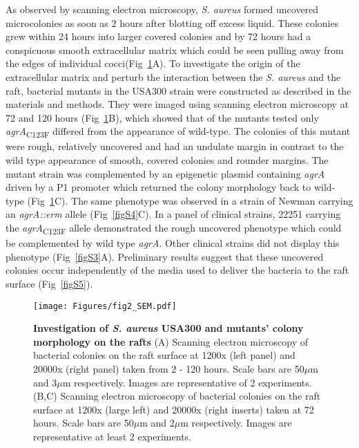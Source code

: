 \documentclass[10pt,letterpaper]{article}
\begin{document}
As observed by scanning electron microscopy, \textit{S. aureus} formed uncovered microcolonies as soon as 2 hours after blotting off excess liquid.
These colonies grew within 24 hours into larger covered colonies and by 72 hours had a conspicuous smooth extracellular matrix which could be seen pulling away from the edges of individual cocci(Fig~\ref{fig2}A).
To investigate the origin of the extracellular matrix and perturb the interaction between the \textit{S. aureus} and the raft, bacterial mutants in the USA300 strain were constructed as described in the materials and methods.
They were imaged using scanning electron microscopy at 72 and 120 hours (Fig~\ref{fig2}B), which showed that of the mutants tested only \textit{agrA}\textsubscript{C123F} differed from the appearance of wild-type.
The colonies of this mutant were rough, relatively uncovered and had an undulate margin in contrast to the wild type appearance of smooth, covered colonies and rounder margins.
The mutant strain was complemented by an epigenetic plasmid containing \textit{agrA} driven by a P1 promoter which returned the colony morphology back to wild-type (Fig~\ref{fig2}C).
The same phenotype was observed in a strain of Newman carrying an \textit{agrA::erm} allele (Fig~\ref{figS4}C).
In a panel of clinical strains, 22251 carrying the \textit{agrA}\textsubscript{C123F} allele demonstrated the rough uncovered phenotype which could be complemented by wild type \textit{agrA}.
Other clinical strains did not display this phenotype (Fig~\ref{figS3}A).
Preliminary results suggest that these uncovered colonies occur independently of the media used to deliver the bacteria to the raft surface (Fig~\ref{figS5}).

\begin{figure}[!ht]
\begin{adjustwidth}{-2.25in}{0in}
\texttt{[image: Figures/fig2\_SEM.pdf]}
\caption[Investigation of \textit{S. aureus} USA300 and mutants' colony morphology on the rafts]{
	\textbf{Investigation of \textit{S. aureus} USA300 and mutants' colony morphology on the rafts}
	(A) Scanning electron microscopy of bacterial colonies on the raft surface at 1200x (left panel) and 20000x (right panel) taken from 2 - 120 hours. Scale bars are 50$\mu$m and 3$\mu$m respectively. Images are representative of 2 experiments.
	(B,C) Scanning electron microscopy of bacterial colonies on the raft surface at 1200x (large left) and 20000x (right inserts) taken at 72 hours. Scale bars are 50$\mu$m and 2$\mu$m respectively. Images are representative at least 2 experiments.}
    \label{fig2}
    \end{adjustwidth}
\end{figure}
\end{document}

